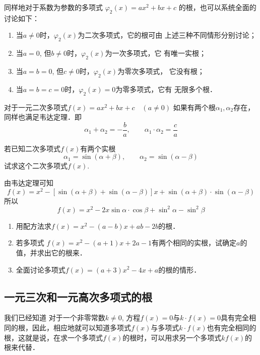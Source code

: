 同样地对于系数为参数的多项式
$\varphi_2 (x) =ax^2+bx+c$
的根，也可以系统全面的讨论如下：

\begin{enumerate}
\item 当$a\ne 0$时，$\varphi_2(x)$为二次多项式，它的根可由
上述三种不同情形分别讨论；
\item 当$a=0$, 但$b\ne 0$时，$\varphi_2(x)$为一次多项式，它
有唯一实根；
\item 当$a=b=0$, 但$c\ne 0$时，$\varphi_2(x)$为零次多项式，
它没有根；
\item 当$a=b=c=0$时，$\varphi_2(x)=0$为零多项式，它有
无限多个根．
\end{enumerate}

对于一元二次多项式$f (x) =ax^2+bx+c\quad  (a\ne 0)$
如果有两个根$\alpha_1,\alpha_2$存在，同样也满足韦达定理．即
\[\alpha_1+\alpha_2=-\frac{b}{a},\qquad \alpha_1\cdot \alpha_2=\frac{c}{a}\]

\begin{example}
    若已知二次多项式$f(x)$有两个实根
  \[  \alpha_1 =\sin (\alpha+\beta) ,\qquad  \alpha_2=\sin (\alpha-\beta) \]
    试求这个二次多项式$f(x)$.
\end{example}

\begin{solution}
    由韦达定理可知
\[f(x)=x^2-[\sin (\alpha+\beta) +\sin (\alpha-\beta) ]x+\sin (\alpha+\beta) \cdot \sin (\alpha-\beta) \]
所以
\[f(x)=x^2-2x\sin\alpha\cdot \cos\beta+\sin^2\alpha-\sin^2\beta\]
\end{solution}

\begin{ex}
\begin{enumerate}
    \item 用配方法求$f(x)=x^2-(a-b)x+ab-2b$的根．
    \item 若多项式
$f (x) =x^2- (a+1) x+2a-1$有两个相同的实根，试确定$a$的值，并求出它的根来．
\item 全面讨论多项式$f(x)=(a+3)x^2-4x+a$的根的情形．
\end{enumerate}
\end{ex}

\subsection{一元三次和一元高次多项式的根}
我们已经知道
对于一个非零常数$k\ne 0$, 方程$f(x)=0$与$k\cdot f(x)=0$具有完全相同的根，因此，相应地就可以知道多项式$f(x)$与多项式$k\cdot f(x)$也有完全相同的根，这就是说，在求一个多项式$f(x)$的根时，可以用求另一个多项式$kf(x)$的根来代替．

